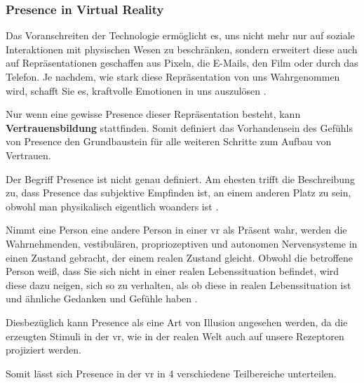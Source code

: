\documentclass[a4paper,11pt]{article}%
\renewcommand{\\}{\vspace*{0.5\baselineskip} \newline}
\begin{document}
		\subsubsection{Presence in Virtual Reality}
			
	Das Voranschreiten der Technologie ermöglicht es, uns nicht mehr nur auf soziale Interaktionen mit physischen Wesen zu beschränken, sondern erweitert diese auch auf Repräsentationen geschaffen aus Pixeln, die E-Mails, den Film oder durch das Telefon. Je nachdem, wie stark diese Repräsentation von uns Wahrgenommen wird, schafft Sie es, kraftvolle Emotionen in uns auszulösen \citep[p. 4-6]{biocca2002defining}.
	
Nur wenn eine gewisse \dq{}Presence\dq{} dieser Repräsentation besteht, kann \textbf{Vertrauensbildung} stattfinden. Somit definiert das Vorhandensein des Gefühls von \dq Presence \dq{} den Grundbaustein für alle weiteren Schritte zum Aufbau von Vertrauen.

Der Begriff \dq{}Presence\dq{} ist nicht genau definiert. Am ehesten trifft die Beschreibung zu, dass \dq{}Presence\dq{} das subjektive Empfinden ist, an einem anderen Platz zu sein, obwohl man physikalisch eigentlich woanders ist \citep[p. 1]{witmer1998measuring}.

	Nimmt eine Person eine andere Person in einer \ac{vr} als Präsent wahr, werden die Wahrnehmenden, vestibulären, propriozeptiven und autonomen Nervensysteme in einen Zustand gebracht, der einem realen Zustand gleicht. Obwohl die betroffene Person weiß, dass Sie sich nicht in einer realen Lebenssituation befindet, wird diese dazu neigen, sich so zu verhalten, als ob diese in realen Lebenssituation ist und ähnliche Gedanken und Gefühle haben \citep{slater2003note}.

Diesbezüglich kann \dq{}Presence\dq{} als eine Art von Illusion angesehen werden, da die erzeugten Stimuli in der \ac{vr}, wie in der realen Welt auch auf unsere Rezeptoren projiziert werden.

Somit lässt sich \dq{}Presence\dq{} in der \ac{vr} in 4 verschiedene Teilbereiche unterteilen.
\end{document}
